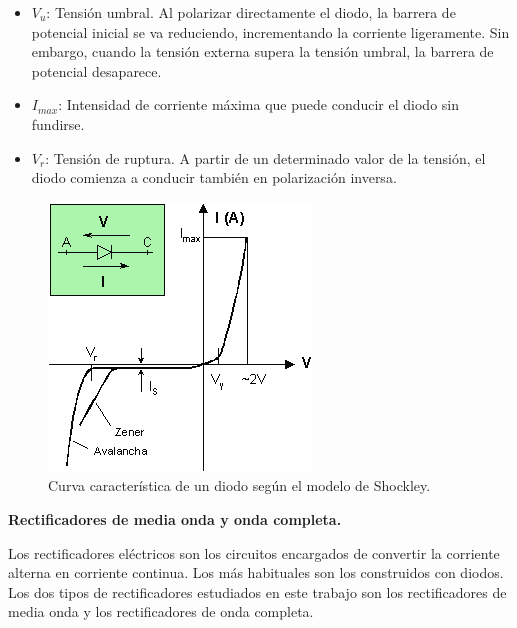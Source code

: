 \documentclass[twoside,twocolumn,a4paper]{article}
\begin{document}
\begin{itemize}
\item 
$V_{u}$: Tensi\'on umbral. Al polarizar directamente el diodo, la barrera de potencial inicial se va reduciendo, incrementando la corriente ligeramente. Sin embargo, cuando la tensi\'on externa supera la tensi\'on umbral, la barrera de potencial desaparece.
\item 
$I_{max}$: Intensidad de corriente m\'axima que puede conducir el diodo sin fundirse.
\item
$V_{r}$: Tensi\'on de ruptura. A partir de un determinado valor de la tensi\'on, el diodo comienza a conducir tambi\'en en polarizaci\'on inversa. 
\end{itemize}

\begin{figure}[h]
\includegraphics[width=\linewidth]{curva_shockley.jpg}
\captionsetup{justification=centering}
\caption{Curva caracter\'istica de un diodo seg\'un el modelo de Shockley.}
\label{fig:curva_shockley}
\end{figure}


\textbf{Rectificadores de media onda y onda completa.} \newline
\par
Los rectificadores el\'ectricos son los circuitos encargados de convertir la corriente alterna en corriente continua. Los m\'as habituales son los construidos con diodos. Los dos tipos de rectificadores estudiados en este trabajo son los rectificadores de media onda y los rectificadores de onda completa. \par
\end{document}
